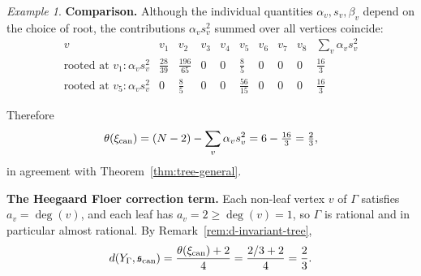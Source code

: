 \documentclass[11pt]{amsart}
\theoremstyle{plain}
\theoremstyle{definition}
\theoremstyle{remark}
\newtheorem{example}[theorem]{Example}
\begin{document}
\begin{example}
\medskip
\noindent\textbf{Comparison.} Although the individual quantities
$\alpha_v,s_v,\beta_v$ depend on the choice of root, the
contributions $\alpha_v s_v^2$ summed over all vertices coincide:
\[
\renewcommand{\arraystretch}{1.3}
\begin{array}{c|cccccccc|c}
v & v_1 & v_2 & v_3 & v_4 & v_5 & v_6 & v_7 & v_8 & \sum_v \alpha_v s_v^2 \\
\hline
\text{rooted at } v_1: \alpha_v s_v^2 & \tfrac{28}{39} & \tfrac{196}{65} & 0 & 0 & \tfrac{8}{5} & 0 & 0 & 0 & \tfrac{16}{3} \\
\text{rooted at } v_5: \alpha_v s_v^2 & 0 & \tfrac{8}{5} & 0 & 0 & \tfrac{56}{15} & 0 & 0 & 0 & \tfrac{16}{3}
\end{array}
\]

Therefore
\[
\theta(\xi_{\rm can})=(N-2)-\sum_v\alpha_v s_v^2
=6-\tfrac{16}{3}=\tfrac{2}{3},
\]
in agreement with Theorem~\ref{thm:tree-general}.

\medskip
\noindent\textbf{The Heegaard Floer correction term.} Each
non-leaf vertex $v$ of $\Gamma$ satisfies $a_v = \deg(v)$, and each
leaf has $a_v = 2 \geq \deg(v) = 1$, so $\Gamma$ is rational and in
particular almost rational. By Remark~\ref{rem:d-invariant-tree},
\[
d(Y_\Gamma,\mathfrak{s}_{\rm can})
= \frac{\theta(\xi_{\rm can}) + 2}{4}
= \frac{2/3 + 2}{4}
= \frac{2}{3}.
\]
\end{example}
\end{document}
